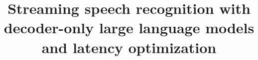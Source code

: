\documentclass{article}
\title{Streaming speech recognition with decoder-only large language models 
and latency optimization}
\begin{document}
\ninept
%
\maketitle
%
\begin{abstract}




\end{abstract}
\end{document}
